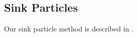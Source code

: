 \subsection{Sink Particles}
\label{sinkParticles}

Our sink particle method is described in \citet{StacyGreifBromm2010}.